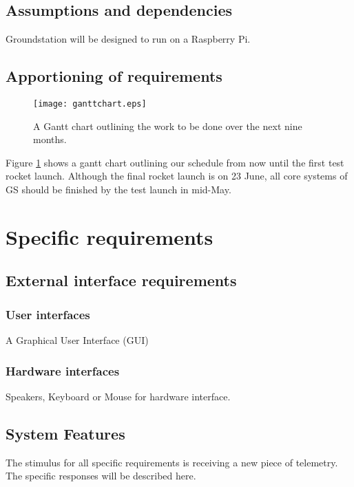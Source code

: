 \documentclass[10pt,journal,draftclsnofoot,onecolumn]{IEEEtran}
\begin{document}
	\subsection{Assumptions and dependencies}
	Groundstation will be designed to run on a Raspberry Pi.
	
	\subsection{Apportioning of requirements}
	
	\begin{figure}
		\texttt{[image: ganttchart.eps]}
		\caption{A Gantt chart outlining the work to be done over the next nine months.}
		\label{fig:gantt}
	\end{figure}
	
	Figure \ref{fig:gantt} shows a gantt chart outlining our schedule from now until the first test rocket launch.
	Although the final rocket launch is on 23 June, all core systems of GS should be finished by the test launch in mid-May.
		
	\section{Specific requirements}
	
	\subsection{External interface requirements}
	\subsubsection{User interfaces}
	A Graphical User Interface (GUI)
	\subsubsection{Hardware interfaces}
	Speakers, Keyboard or Mouse for hardware interface.
	
	\subsection{System Features}
	
	The stimulus for all specific requirements is receiving a new piece of telemetry. The specific responses will be described here.


		
\end{document}
